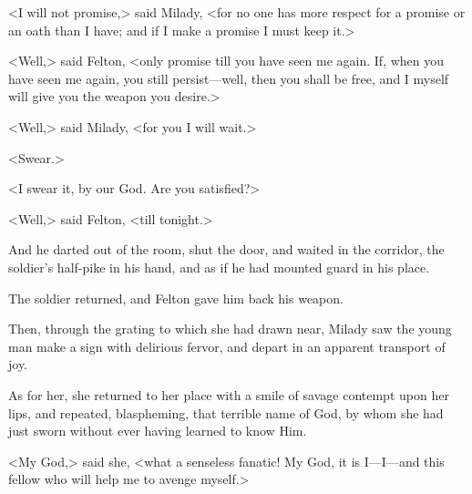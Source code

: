 <I will not promise,> said Milady, <for no one has more respect for a promise or an oath than I have; and if I make a promise I must keep it.> 

<Well,> said Felton, <only promise till you have seen me again. If, when you have seen me again, you still persist---well, then you shall be free, and I myself will give you the weapon you desire.> 

<Well,> said Milady, <for you I will wait.> 

<Swear.> 

<I swear it, by our God. Are you satisfied?> 

<Well,> said Felton, <till tonight.> 

And he darted out of the room, shut the door, and waited in the corridor, the soldier's half-pike in his hand, and as if he had mounted guard in his place. 

The soldier returned, and Felton gave him back his weapon. 

Then, through the grating to which she had drawn near, Milady saw the young man make a sign with delirious fervor, and depart in an apparent transport of joy. 

As for her, she returned to her place with a smile of savage contempt upon her lips, and repeated, blaspheming, that terrible name of God, by whom she had just sworn without ever having learned to know Him. 

<My God,> said she, <what a senseless fanatic! My God, it is I---I---and this fellow who will help me to avenge myself.> 